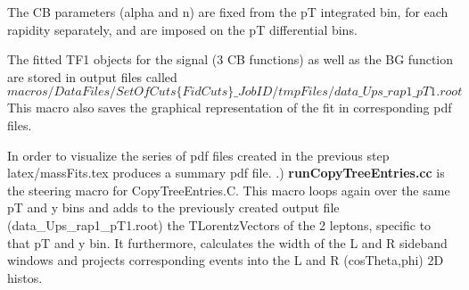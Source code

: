 \documentclass{article}
\begin{document}
The CB parameters (alpha and n) are fixed from the pT integrated bin,
for each rapidity separately, and are imposed on the pT differential
bins. 

The fitted TF1 objects for the signal (3 CB functions) as well as the
BG function are stored in output files called
\newline
\newline
   $macros/DataFiles/SetOfCuts\{FidCuts\}\_JobID/tmpFiles/data\_Ups\_rap1\_pT1.root$
\newline
\newline
This macro also saves the graphical representation of the fit in
corresponding pdf files.

In order to visualize the series of pdf files created in the
previous step latex/massFits.tex produces a summary pdf file.
\newline
{}.) {\bf runCopyTreeEntries.cc} is the steering macro for
CopyTreeEntries.C. This macro loops again over the same pT and y bins
and adds to the previously created output file
(data\_Ups\_rap1\_pT1.root) the TLorentzVectors of the 2 leptons,
specific to that pT and y bin. It furthermore, calculates the width of
the L and R sideband windows and projects corresponding events into
the L and R (cosTheta,phi) 2D histos.
\end{document}
